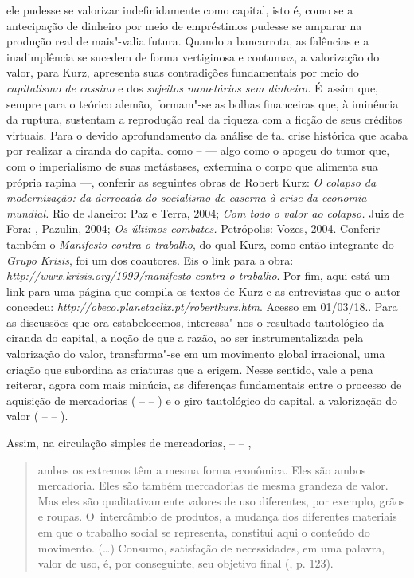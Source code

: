 {  ele pudesse se valorizar indefinidamente como capital, isto é, como se
  a antecipação de dinheiro por meio de empréstimos pudesse se amparar
  na produção real de mais"-valia futura. Quando a bancarrota, as
  falências e a inadimplência se sucedem de forma vertiginosa e
  contumaz, a valorização do valor, para Kurz, apresenta suas
  contradições fundamentais por meio do \emph{capitalismo de cassino} e
  dos \emph{sujeitos monetários sem dinheiro.} É~assim que, sempre para
  o teórico alemão, formam"-se as bolhas financeiras que, à iminência da
  ruptura, sustentam a reprodução real da riqueza com a ficção de seus
  créditos virtuais. Para o devido aprofundamento da análise de tal
  crise histórica que acaba por realizar a ciranda do capital como  --
   --- algo como o apogeu do tumor que, com o imperialismo de suas
  metástases, extermina o corpo que alimenta sua própria rapina ---,
  conferir as seguintes obras de Robert Kurz: \emph{O colapso da
  modernização: da derrocada do socialismo de caserna à crise da
  economia mundial.} Rio de Janeiro: Paz e Terra, 2004; \emph{Com todo o
  valor ao colapso.} Juiz de Fora: , Pazulin, 2004; \emph{Os últimos
  combates.} Petrópolis: Vozes, 2004. Conferir também o \emph{Manifesto
  contra o trabalho}, do qual Kurz, como então integrante do \emph{Grupo
  Krisis}, foi um dos coautores. Eis o link para a obra:
  \emph{http://www.krisis.org/1999/manifesto-contra-o-trabalho}.
  Por fim, aqui está um link para uma página que compila os textos de
  Kurz e as entrevistas que o autor concedeu:
  \emph{http://obeco.planetaclix.pt/robertkurz.htm}.
  Acesso em 01/03/18.}. Para as discussões que ora estabelecemos,
interessa"-nos o resultado tautológico da ciranda do capital, a noção de
que a razão, ao ser instrumentalizada pela valorização do valor,
transforma"-se em um movimento global irracional, uma criação que
subordina as criaturas que a erigem. Nesse sentido, vale a pena
reiterar, agora com mais minúcia, as diferenças fundamentais entre o
processo de aquisição de mercadorias ( --  -- ) e o giro tautológico
do capital, a valorização do valor ( --  -- ).

Assim, na circulação simples de mercadorias,  --  -- ,

\begin{quote}
ambos os extremos têm a mesma forma econômica. Eles são ambos
mercadoria. Eles são também mercadorias de mesma grandeza de valor. Mas
eles são qualitativamente valores de uso diferentes, por exemplo, grãos
e roupas. O~intercâmbio de produtos, a mudança dos diferentes materiais
em que o trabalho social se representa, constitui aqui o conteúdo do
movimento. (\ldots) Consumo, satisfação de necessidades, em uma palavra,
valor de uso, é, por conseguinte, seu objetivo final (, p. 123).
\end{quote}

